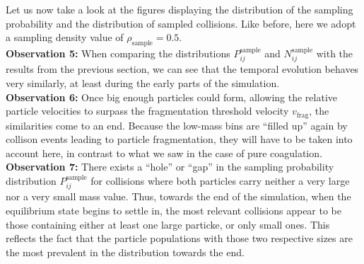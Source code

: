         Let us now take a look at the figures displaying the distribution of the 
        sampling probability and the distribution of sampled collisions.
        Like before, here we adopt a sampling density value of $\rho_\text{sample} = 0.5$. \\

        \textbf{Observation 5:}
        When comparing the distributions $P^\text{sample}_{ij}$ and $N^\text{sample}_{ij}$
        with the results from the previous section, we can see that the temporal 
        evolution behaves very similarly, at least during the early parts of the 
        simulation. \\

        \textbf{Observation 6:} Once big enough particles could form, allowing the 
        relative particle velocities to surpass the fragmentation threshold 
        velocity $v_\text{frag}$, the similarities come to an end. Because the low-mass 
        bins are ``filled up'' again by collison events leading to particle fragmentation,
        they will have to be taken into account here, in contrast to what we saw in the 
        case of pure coagulation. \\

        \textbf{Observation 7:} There exists a ``hole'' or ``gap'' in the sampling probability
        distribution $P_{ij}^\text{sample}$ for collisions where both particles carry 
        neither a very large nor a very small mass value. 
        Thus, towards the end of the simulation, when the equilibrium state begins to 
        settle in, the most relevant collisions appear to be those containing either 
        at least one large particke, or only small ones. This reflects the fact that the 
        particle populations with those two respective sizes are the most prevalent in 
        the distribution towards the end.
        \\


